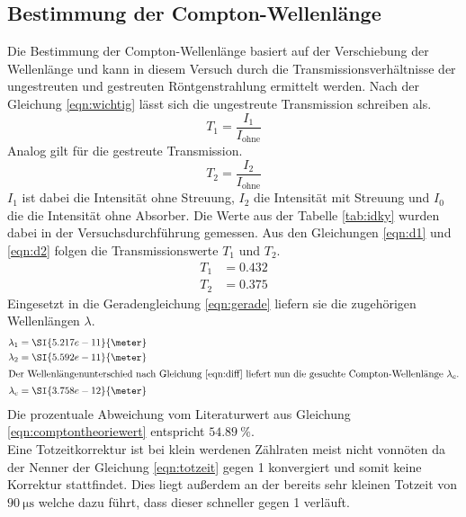 \subsection{Bestimmung der Compton-Wellenlänge}
Die Bestimmung der Compton-Wellenlänge basiert auf der Verschiebung der Wellenlänge und kann in diesem Versuch durch die Transmissionsverhältnisse
der ungestreuten und gestreuten Röntgenstrahlung ermittelt werden. Nach der Gleichung \eqref{eqn:wichtig} lässt sich die ungestreute Transmission schreiben als.
\begin{equation}
\label{eqn:d1}
T_{1} = \frac{I_{1}}{I_{\text{ohne}}}
\end{equation}
Analog gilt für die gestreute Transmission.
\begin{equation}
\label{eqn:d2}
T_{2} = \frac{I_{2}}{I_{\text{ohne}}}
\end{equation}
$I_{1}$ ist dabei die Intensität ohne Streuung, $I_{2}$ die Intensität mit Streuung  und $I_{0}$ die die Intensität ohne Absorber.
Die Werte aus der Tabelle \ref{tab:idky} wurden dabei in der Versuchsdurchführung gemessen.
Aus den Gleichungen \eqref{eqn:d1} und \eqref{eqn:d2} folgen die Transmissionswerte $T_{1}$ und $T_{2}$.
\begin{align*}
T_{1} &= 0.432 \\
T_{2} &= 0.375
\end{align*}
Eingesetzt in die Geradengleichung \eqref{eqn:gerade} liefern sie die zugehörigen Wellenlängen $\lambda$.
\begin{align}
\lambda_{1} &=  \SI{5.217e-11}{\meter} \\
\lambda_{2} &=  \SI{5.592e-11}{\meter} \\
\intertext{Der Wellenlängenunterschied nach Gleichung \eqref{eqn:diff} liefert nun die gesuchte Compton-Wellenlänge $\lambda_{c}$.}
\lambda_{c} &= \SI{3.758e-12}{\meter} 
\end{align}
Die prozentuale Abweichung vom Literaturwert aus Gleichung \eqref{eqn:comptontheoriewert} entspricht $\SI{54.89}{\percent}$.
\\
Eine Totzeitkorrektur ist bei klein werdenen Zählraten meist nicht vonnöten da der Nenner der Gleichung \eqref{eqn:totzeit} gegen 1 konvergiert und somit keine
Korrektur stattfindet. Dies liegt außerdem an der bereits sehr kleinen Totzeit von $\SI{90}{\micro\second}$ welche dazu führt, dass dieser schneller gegen 1 verläuft.
